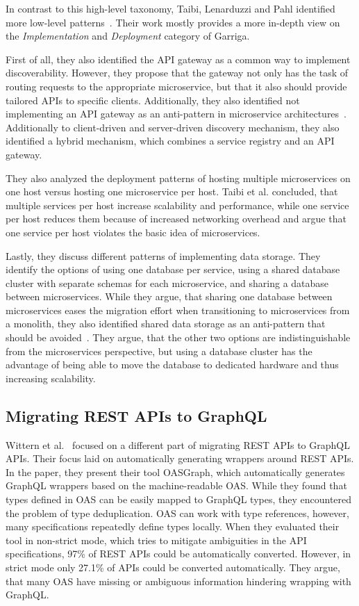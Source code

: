 In contrast to this high-level taxonomy, Taibi, Lenarduzzi and Pahl identified more low-level patterns~\cite{Taibi2018}.
Their work mostly provides a more in-depth view on the \textit{Implementation} and \textit{Deployment} category of Garriga.

First of all, they also identified the \ac{API} gateway as a common way to implement discoverability.
However, they propose that the gateway not only has the task of routing requests to the appropriate microservice, but that it also should provide tailored \acp{API} to specific clients.
Additionally, they also identified not implementing an \ac{API} gateway as an anti-pattern in microservice architectures~\cite{Taibi2020}.
Additionally to client-driven and server-driven discovery mechanism, they also identified a hybrid mechanism, which combines a service registry and an \ac{API} gateway.

They also analyzed the deployment patterns of hosting multiple microservices on one host versus hosting one microservice per host.
Taibi et al. concluded, that multiple services per host increase scalability and performance, while one service per host reduces them because of increased networking overhead and argue that one service per host violates the basic idea of microservices.

Lastly, they discuss different patterns of implementing data storage.
They identify the options of using one database per service, using a shared database cluster with separate schemas for each microservice, and sharing a database between microservices.
While they argue, that sharing one database between microservices eases the migration effort when transitioning to microservices from a monolith, they also identified shared data storage as an anti-pattern that should be avoided~\cite{Taibi2020}.
They argue, that the other two options are indistinguishable from the microservices perspective, but using a database cluster has the advantage of being able to move the database to dedicated hardware and thus increasing scalability.

\subsection{Migrating \acs{REST} \acsp{API} to GraphQL}\label{sec:rel-2}

Wittern et al.~\cite{Wittern2019} focused on a different part of migrating \ac{REST} \acp{API} to GraphQL \acp{API}.
Their focus laid on automatically generating wrappers around \ac{REST} \acp{API}.
In the paper, they present their tool \acs{OAS}Graph, which automatically generates GraphQL wrappers based on the machine-readable \ac{OAS}.
While they found that types defined in \ac{OAS} can be easily mapped to GraphQL types, they encountered the problem of type deduplication.
\ac{OAS} can work with type references, however, many specifications repeatedly define types locally.
When they evaluated their tool in non-strict mode, which tries to mitigate ambiguities in the \ac{API} specifications, 97\% of \ac{REST} \acp{API} could be automatically converted.
However, in strict mode only 27.1\% of \acp{API} could be converted automatically.
They argue, that many \ac{OAS} have missing or ambiguous information hindering wrapping with GraphQL.

